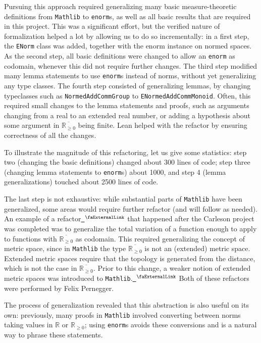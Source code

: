 \documentclass[12pt, reqno]{amsart}
\let\lean\lstinline
\newcommand*{\real}{\mathbb{R}} %
\newcommand{\nnreal}{\real_{\ge0}}
\newcommand{\ennreal}{\overline{\real_{\ge0}}}
\newcommand{\mathlib}{\texttt{Mathlib}\xspace}
\newcommand{\extlink}{~\ensuremath{{}^\text{\faExternalLink}}}
\theoremstyle{definition}
\theoremstyle{plain}
\begin{document}
Pursuing this approach required generalizing many basic measure-theoretic definitions from \mathlib to \lean{enorm}s, as well as all basic results that are required in this project. This was a significant effort, but the verified nature of formalization helped a lot by allowing us to do so incrementally: in a first step, the \lean{ENorm} class was added, together with the enorm instance on normed spaces. As the second step, all basic definitions were changed to allow an \lean{enorm} as codomain, whenever this did not require further changes. The third step modified many lemma statements to use \lean{enorm}s instead of norms, without yet generalizing any type classes. The fourth step consisted of generalizing lemmas, by changing typeclasses such as \lean{NormedAddCommGroup} to \lean{ENormedAddCommMonoid}. Often, this required small changes to the lemma statements and proofs, such as arguments changing from a real to an extended real number, or adding a hypothesis about some argument in $\ennreal$ being finite. Lean helped with the refactor by ensuring correctness of all the changes.

To illustrate the magnitude of this refactoring, let us give some statistics: step two (changing the basic definitions) changed about 300 lines of code; step three (changing lemma statements to \lean{enorm}s) about 1000, and step 4 (lemma generalizations) touched about 2500 lines of code.

The last step is not exhaustive: while substantial parts of \mathlib have been generalized, some areas would require further refactor (and will follow as needed). An example of a refactor\href{https://github.com/leanprover-community/mathlib4/pull/42662}{\extlink} that happened after the Carleson project was completed was to generalize the total variation of a function enough to apply to functions with $\ennreal$ as codomain. This required generalizing the concept of metric space, since in \mathlib the type $\ennreal$ is not an (extended) metric space. Extended metric spaces require that the topology is generated from the distance, which is not the case in $\ennreal$.
Prior to this change, a weaker notion of extended metric spaces was introduced to \mathlib.\href{https://github.com/leanprover-community/mathlib4/pull/38105}{\extlink} Both of these refactors were performed by Felix Pernegger.

The process of generalization revealed that this abstraction is also useful on its own: previously, many proofs in \mathlib involved converting between norms taking values in $\real$ or $\nnreal$; using \lean{enorm}s avoids these conversions and is a natural way to phrase these statements.
\end{document}

